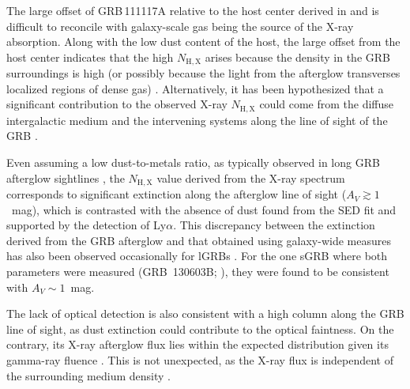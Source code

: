\documentclass[longauth]{aa}    %
\newcommand{\lya}{Ly$\alpha$}
\begin{document}
The  large offset of GRB\,111117A relative to the host center derived in
\citet{Margutti2012} and \citet{Sakamoto2013} is difficult to reconcile with
galaxy-scale gas being the source of the X-ray absorption. Along with the low
dust content of the host, the large offset from the host center indicates that
the high $N_\mathrm{H,X}$ arises because the density in the GRB surroundings is
high (or possibly because the light from the afterglow transverses localized
regions of dense gas)
\citep[see, e.g.,][]{Watson2013, Krongold2013}. Alternatively, it has been
hypothesized that a significant contribution to the observed X-ray
$N_\mathrm{H,X}$ could come from the diffuse intergalactic medium and the
intervening systems along the line of sight of the GRB \citep{Campana2012,
        Arcodia2016}  \citep[but see also][]{Watson2013, Krongold2013}.

Even assuming a low dust-to-metals ratio, as typically observed in long GRB
afterglow sightlines \citep{Galama2001, Schady2010, Covino2013}, the
$N_\mathrm{H,X}$ value derived from the X-ray spectrum corresponds to
significant extinction along the afterglow line of sight ($A_V \gtrsim 1$~mag),
which is contrasted with the absence of dust found from the SED fit and supported
by the detection of \lya{}. This discrepancy between the extinction derived
from the GRB afterglow and that obtained using galaxy-wide measures has also
been observed occasionally for lGRBs \citep{Perley2013a}. For the one sGRB where
both parameters were measured (GRB~130603B; \citealt{DeUgartePostigo2014b}),
they were found to be consistent with $A_V \sim 1$~mag.

The lack of optical detection is also consistent with a high column along the
GRB line of sight, as dust extinction could contribute to the optical faintness.
On the contrary, its X-ray afterglow flux lies within the expected distribution
given its gamma-ray fluence \citep{DAvanzo2014a}. This is not unexpected, as the
X-ray flux is independent of the surrounding medium density \citep{Freedman2001,
        Berger2003, Nysewander2009}.
\end{document}
